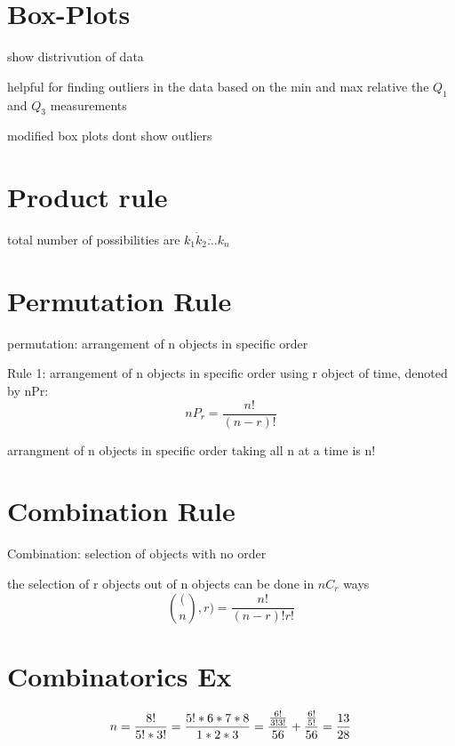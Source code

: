 \documentclass[11pt]{amsart}
\begin{document}
\section{Box-Plots}
\par show distrivution of data
\par helpful for finding outliers in the data based on the min and max relative
the $Q_1$ and $Q_3$ measurements
\par modified box plots dont show outliers
\section{Product rule}
\par total number of possibilities are $k_1 \dot k_2 \dot \dots k_n$
\section{Permutation Rule}
\par permutation: arrangement of n objects in specific order
\par Rule 1: arrangement of n objects in specific order using r object of
time, denoted by nPr:
\begin{equation}
  nP_r = \frac{n!}{(n-r)!}
\end{equation}
\par arrangment of n objects in specific order taking all n at a time is n!
\section{Combination Rule}
\par Combination: selection of objects with no order
\par the selection of r objects out of n objects can be done in $nC_r$ ways
\begin{equation}
  \binom(n, r) = \frac{n!}{(n-r)!r!}
\end{equation}
\section{Combinatorics Ex}
\begin{equation}
  n = \frac{8!}{5!*3!} \\
    = \frac{5!*6*7*8}{1*2*3} \\
    = \frac{ \frac{6!}{3!3!}}{56} + \frac{\frac{6!}{5!}}{56} \\
    = \frac{13}{28} \\
\end{equation}
\end{document}
